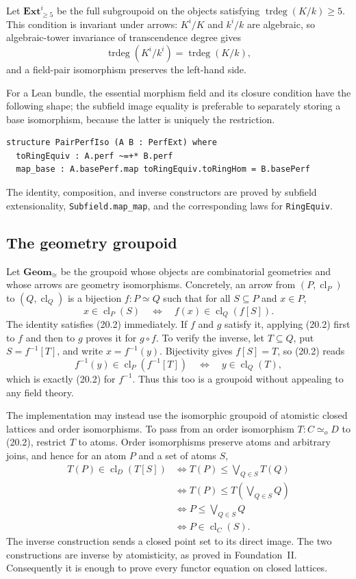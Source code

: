 \documentclass[11pt,oneside]{article}
\theoremstyle{definition}
\theoremstyle{remark}
\newcommand{\trdeg}{\operatorname{trdeg}}
\newcommand{\cl}{\operatorname{cl}}
\newcommand{\lean}[1]{\nolinkurl{#1}}
\begin{document}
Let $\mathbf{Ext}^{i}_{\geq5}$ be the full subgroupoid on the objects satisfying
$\trdeg(K/k)\geq5$.  This condition is invariant under arrows: $K^i/K$ and $k^i/k$ are
algebraic, so algebraic-tower invariance of transcendence degree gives
\[
 \trdeg(K^i/k^i)=\trdeg(K/k),
\]
and a field-pair isomorphism preserves the left-hand side.

For a Lean bundle, the essential morphism field and its closure condition have the
following shape; the subfield image equality is preferable to separately storing a base
isomorphism, because the latter is uniquely the restriction.
\begin{lstlisting}
structure PairPerfIso (A B : PerfExt) where
  toRingEquiv : A.perf ~=+* B.perf
  map_base : A.basePerf.map toRingEquiv.toRingHom = B.basePerf
\end{lstlisting}
The identity, composition, and inverse constructors are proved by subfield extensionality,
\lean{Subfield.map_map}, and the corresponding laws for \lean{RingEquiv}.

\subsection{The geometry groupoid}

Let $\mathbf{Geom}_{\cong}$ be the groupoid whose objects are combinatorial geometries and
whose arrows are geometry isomorphisms.  Concretely, an arrow from $(P,\cl_P)$ to
$(Q,\cl_Q)$ is a bijection $f:P\simeq Q$ such that for all $S\subseteq P$ and $x\in P$,
\[
 x\in\cl_P(S)\quad\Longleftrightarrow\quad
 f(x)\in\cl_Q(f[S]).                                           \tag{20.2}
\]
The identity satisfies (20.2) immediately.  If $f$ and $g$ satisfy it, applying (20.2)
first to $f$ and then to $g$ proves it for $g\circ f$.  To verify the inverse, let
$T\subseteq Q$, put $S=f^{-1}[T]$, and write $x=f^{-1}(y)$.  Bijectivity gives
$f[S]=T$, so (20.2) reads
\[
 f^{-1}(y)\in\cl_P(f^{-1}[T])\quad\Longleftrightarrow\quad
 y\in\cl_Q(T),
\]
which is exactly (20.2) for $f^{-1}$.  Thus this too is a groupoid without appealing to
any field theory.

The implementation may instead use the isomorphic groupoid of atomistic closed lattices
and order isomorphisms.  To pass from an order isomorphism $T:C\simeq_o D$ to (20.2),
restrict $T$ to atoms.  Order isomorphisms preserve atoms and arbitrary joins, and hence
for an atom $P$ and a set of atoms $S$,
\[
\begin{aligned}
 T(P)\in\cl_D(T[S])
 &\Longleftrightarrow T(P)\leq\bigvee_{Q\in S}T(Q)\\
 &\Longleftrightarrow T(P)\leq T\!\left(\bigvee_{Q\in S}Q\right)\\
 &\Longleftrightarrow P\leq\bigvee_{Q\in S}Q\\
 &\Longleftrightarrow P\in\cl_C(S).
\end{aligned}                                                   \tag{20.3}
\]
The inverse construction sends a closed point set to its direct image.  The two
constructions are inverse by atomisticity, as proved in Foundation~II.  Consequently it is
enough to prove every functor equation on closed lattices.
\end{document}
